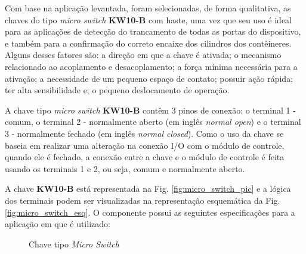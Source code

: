     Com base na aplicação levantada, foram selecionadas, de forma qualitativa, as chaves do tipo \textit{micro switch} \textbf{KW10-B} com haste, uma vez que seu uso é ideal para as aplicações de detecção do trancamento de todas as portas do dispositivo, e também para a confirmação do correto encaixe dos cilindros dos contêineres. Alguns desses fatores são: a direção em que a chave é ativada; o mecanismo relacionado ao acoplamento e desacoplamento; a força mínima necessária para a ativação; a necessidade de um pequeno espaço de contato; possuir ação rápida; ter alta sensibilidade e; o pequeno deslocamento de operação.
    
    A chave tipo \textit{micro switch} \textbf{KW10-B} contêm 3 pinos de conexão: o terminal 1 - comum, o terminal 2 - normalmente aberto (em inglês \textit{normal open}) e o terminal 3 - normalmente fechado (em inglês \textit{normal closed}). Como o uso da chave se baseia em realizar uma alteração na conexão I/O com o módulo de controle, quando ele é fechado, a conexão entre a chave e o módulo de controle é feita usando os terminais 1 e 2, ou seja, comum e normalmente aberto. 
    
    
    A chave \textbf{KW10-B} está representada na Fig. \ref{fig:micro_switch_pic} e a lógica dos terminais podem ser visualizadas na representação esquemática da Fig. \ref{fig:micro_switch_esq}. O componente possui as seguintes especificações para a aplicação em que é utilizado:
    
    \begin{figure}[H]
        \centering
        \hspace{0.1\textwidth}
        \caption{Chave tipo \textit{Micro Switch}}\label{fig:micro_switch}
    \end{figure}

